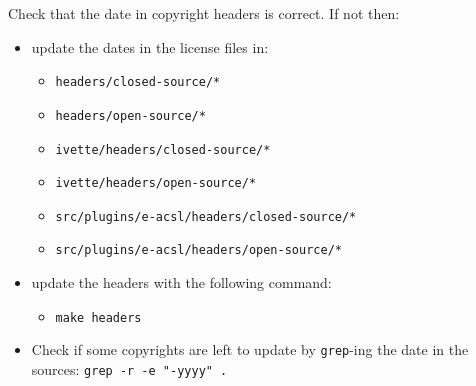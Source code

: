 Check that the date in copyright headers is correct. If not then:
\begin{itemize}
  \item update the dates in the license files in:
  \begin{itemize}
    \item \texttt{headers/closed-source/*}
    \item \texttt{headers/open-source/*}
    \item \texttt{ivette/headers/closed-source/*}
    \item \texttt{ivette/headers/open-source/*}
    \item \texttt{src/plugins/e-acsl/headers/closed-source/*}
    \item \texttt{src/plugins/e-acsl/headers/open-source/*}
  \end{itemize}
  \item update the headers with the following command:
  \begin{itemize}
    \item \texttt{make headers}
  \end{itemize}
  \item Check if some copyrights are left to update by \texttt{grep}-ing the date in the sources: \texttt{grep -r -e "-yyyy" .}
\end{itemize}

